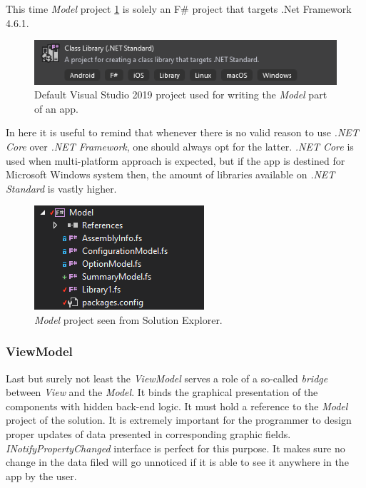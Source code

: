         This time \textit{Model} project \ref{fig:model_VS19Project} is solely an F\# project that targets .Net Framework 4.6.1.
        \begin{figure}[H]
            \centering
            \includegraphics{img/model_VS19Project.png}
            \caption{Default Visual Studio 2019 project used for writing the \textit{Model} part of an app.}
            \label{fig:model_VS19Project}
        \end{figure}
        
        In here it is useful to remind that whenever there is no valid reason to use \textit{.NET Core} over \textit{.NET Framework}, one should always opt for the latter. \textit{.NET Core} is used when multi-platform approach is expected, but if the app is destined for Microsoft Windows system then, the amount of libraries available on \textit{.NET Standard} is vastly higher.
        
        \begin{figure}[H]
            \centering
            \includegraphics{img/model.png}
            \caption{\textit{Model} project seen from Solution Explorer.}
            \label{fig:model}
        \end{figure} 
        
    \subsubsection{ViewModel}    
        Last but surely not least the \textit{ViewModel} serves a role of a so-called \textit{bridge} between \textit{View} and the \textit{Model}. It binds the graphical presentation of the components with hidden back-end logic. It must hold a reference to the \textit{Model} project of the solution. It is extremely important for the programmer to design proper updates of data presented in corresponding graphic fields. \textit{INotifyPropertyChanged} interface is perfect for this purpose. It makes sure no change in the data filed will go unnoticed if it is able to see it anywhere in the app by the user.
        
